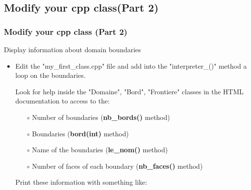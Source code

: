 \documentclass[10pt, hyperref={unicode=true,pdfusetitle, bookmarks=true,bookmarksnumbered=false,bookmarksopen=false, breaklinks=false,pdfborder={0 0 1},backref=true,colorlinks=true,linkcolor=darkblue,pageanchor, urlcolor=darkblue}]{beamer}
\begin{document}
\subsection{{\bf{Modify your cpp class(Part 2)}}}
\begin{frame}
\frametitle{Modify your cpp class (Part 2)}
\begin{block}{Display information about domain boundaries}

\begin{itemize}

\item Edit the "my\_first\_class.cpp" file and add into the "interpreter\_()" method a loop on the boundaries.

Look for help inside the "Domaine", "Bord", "Frontiere" classes in the HTML documentation to access to the:
    \begin{itemize}
    \item [$\circ$] Number of boundaries (\textbf{nb\_bords()} method)
    \item [$\circ$] Boundaries (\textbf{bord(int)} method)
    \item [$\circ$] Name of the boundaries (\textbf{le\_nom()} method)
    \item [$\circ$] Number of faces of each boundary (\textbf{nb\_faces()} method)
    \end{itemize}

Print these information with something like:
\begin{center}
\end{center}
\end{itemize}

\end{block}
\end{frame}
\end{document}
